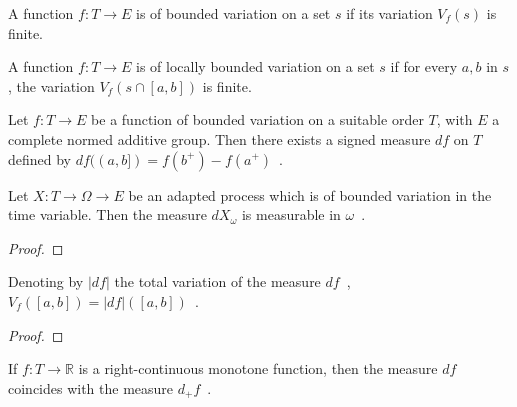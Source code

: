 \begin{definition}\label{def:BoundedVariationOn}
  \mathlibok
A function $f : T \to E$ is of bounded variation on a set $s$ if its variation $V_f(s)$ is finite.
\end{definition}


\begin{definition}\label{def:LocallyBoundedVariationOn}
  \mathlibok
A function $f : T \to E$ is of locally bounded variation on a set $s$ if for every $a, b$ in $s$, the variation $V_f(s \cap [a, b])$ is finite.
\end{definition}


\begin{definition}\label{def:BoundedVariationOn.vectorMeasure}
  \mathlibok
Let $f : T \to E$ be a function of bounded variation on a suitable order $T$, with $E$ a complete normed additive group.
Then there exists a signed measure $df$ on $T$ defined by $df((a, b]) = f(b^+) - f(a^+)$~.
\end{definition}


\begin{lemma}\label{lem:BoundedVariationOn.measurable_vectorMeasure}
Let $X : T \to \Omega \to E$ be an adapted process which is of bounded variation in the time variable.
Then the measure $dX_\omega$ is measurable in $\omega$~.
\end{lemma}

\begin{proof}

\end{proof}


\begin{lemma}\label{lem:eVariationOn_eq_totalVariation}
Denoting by $\vert df \vert$ the total variation of the measure $df$~,
$V_f([a, b]) = \vert df \vert([a, b])$~.
\end{lemma}

\begin{proof}

\end{proof}


\begin{lemma}\label{lem:BoundedVariationOn.vectorMeasure_of_monotone}
If $f : T \to \mathbb{R}$ is a right-continuous monotone function, then the measure $df$ coincides with the measure $d_+ f$~.
\end{lemma}

